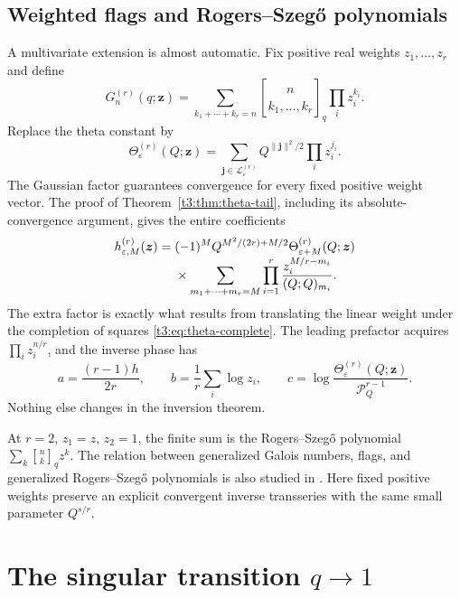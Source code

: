 \documentclass[11pt,openany]{book}
\numberwithin{equation}{chapter}
\theoremstyle{plain}
\theoremstyle{definition}
\theoremstyle{remark}
\newcommand{\qbinq}[2]{\genfrac{[}{]}{0pt}{}{#1}{#2}_{q}}   %
\newcommand{\pp}[1]{(Q;Q)_{#1}}
\newcommand{\Pinf}{\mathcal P_Q}
\newcommand{\eps}{\varepsilon}
\newcommand{\T}{\Theta}
\begin{document}
\section{Weighted flags and Rogers--Szeg\H{o} polynomials}
\label{t3:sec:weighted-Galois}

A multivariate extension is almost automatic. Fix positive real weights $z_1,\ldots,z_r$ and define
\begin{equation}\label{t3:eq:weightedGalois}
 G_n^{(r)}(q;\boldsymbol z)=
 \sum_{k_1+\cdots+k_r=n}
 \genfrac{[}{]}{0pt}{}{n}{k_1,\ldots,k_r}_q
 \prod_i z_i^{k_i}.
\end{equation}
Replace the theta constant by
\begin{equation}\label{t3:eq:weightedtheta}
 \T_{\eps}^{(r)}(Q;\boldsymbol z)=
 \sum_{\boldsymbol j\in\mathcal L_{\eps}^{(r)}}
 Q^{\|\boldsymbol j\|^2/2}\prod_i z_i^{j_i}.
\end{equation}
The Gaussian factor guarantees convergence for every fixed positive weight vector. The proof of Theorem~\ref{t3:thm:theta-tail}, including its absolute-convergence argument, gives the entire coefficients
\begin{align}\label{t3:eq:weightedh}
 h_{\eps,M}^{(r)}(\boldsymbol z)
 ={}&(-1)^M Q^{M^2/(2r)+M/2}
       \T_{\eps+M}^{(r)}(Q;\boldsymbol z)\\[-0.3em]
 &\times\sum_{m_1+\cdots+m_r=M}
       \prod_{i=1}^r\frac{z_i^{M/r-m_i}}{\pp{m_i}}.\notag
\end{align}
The extra factor is exactly what results from translating the linear weight under the completion of squares \eqref{t3:eq:theta-complete}. The leading prefactor acquires
$\prod_i z_i^{n/r}$, and the inverse phase has
\begin{equation}\label{t3:eq:weightedphase}
 a=\frac{(r-1)h}{2r},\qquad
 b=\frac1r\sum_i\log z_i,\qquad
 c=\log\frac{\T_{\eps}^{(r)}(Q;\boldsymbol z)}{\Pinf^{r-1}}.
\end{equation}
Nothing else changes in the inversion theorem.

At $r=2$, $z_1=z$, $z_2=1$, the finite sum is the Rogers--Szeg\H{o} polynomial
$\sum_k\qbinq{n}{k}z^k$. The relation between generalized Galois numbers, flags, and generalized Rogers--Szeg\H{o} polynomials is also studied in \cite{bliem}. Here fixed positive weights preserve an explicit convergent inverse transseries with the same small parameter $Q^{s/r}$.

\chapter{The singular transition $q\to1$}
\label{ct:ch:double}
\end{document}
